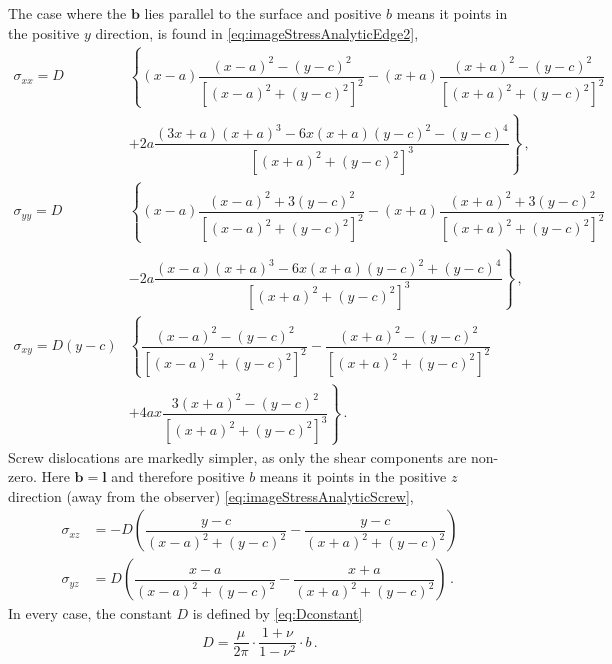 \documentclass[11pt]{iopart}
\begin{document}
The case where the $\bm{b}$ lies parallel to the surface and positive $b$ means it points in the positive $y$ direction, is found in \cref{eq:imageStressAnalyticEdge2},
\begin{subequations}
    \begin{align}\label{eq:imageStressAnalyticEdge2}
        \sigma_{xx} = D         & \left\{ (x - a) \dfrac{(x - a)^2 - (y - c)^2}{[(x - a)^2 + (y - c)^2]^2} -(x + a) \dfrac{(x + a)^2 - (y - c)^2}{[(x + a)^2 + (y - c)^2]^2} \right.     \\\nonumber
                                & \left. + 2 a \dfrac{(3 x + a) (x + a)^3 - 6 x (x + a) (y - c)^2 - (y - c)^4}{[(x + a)^2 + (y - c)^2]^3}\right\}\,,                                     \\
        \sigma_{yy} = D         & \left\{ (x - a) \dfrac{(x - a)^2 + 3 (y - c)^2}{[(x - a)^2 + (y - c)^2]^2} - (x + a) \dfrac{(x + a)^2 + 3 (y - c)^2}{[(x + a)^2 + (y - c)^2]^2}\right. \\\nonumber
                                & \left. - 2 a \dfrac{(x - a) (x + a)^3 - 6 x (x + a) (y - c)^2 + (y - c)^4}{[(x + a)^2 + (y - c)^2]^3}\right\}\,,                                       \\
        \sigma_{xy} = D (y - c) & \left\{\dfrac{(x - a)^2 - (y - c)^2}{[(x - a)^2 + (y - c)^2]^2} - \dfrac{(x + a)^2 - (y - c)^2}{[(x + a)^2 + (y - c)^2]^2} \right.                     \\\nonumber
                                & \left. + 4 a x \dfrac{3 (x + a)^2 - (y - c)^2}{[(x + a)^2 + (y - c)^2]^3}\right\}\,.
    \end{align}
\end{subequations}
Screw dislocations are markedly simpler, as only the shear components are non-zero. Here $\bm{b} = \bm{l}$ and therefore positive $b$ means it points in the positive $z$ direction (away from the observer) \cref{eq:imageStressAnalyticScrew},
\begin{subequations}
    \begin{align}\label{eq:imageStressAnalyticScrew}
        \sigma_{xz} & = -D \left(\dfrac{y - c}{(x - a)^2 + (y - c)^2} - \dfrac{y - c}{(x + a)^2 + (y - c)^2}\right)   \\
        \sigma_{yz} & = D \left(\dfrac{x - a}{(x - a)^2 + (y - c)^2} - \dfrac{x + a}{(x + a)^2 + (y - c)^2}\right)\,.
    \end{align}
\end{subequations}
In every case, the constant $D$ is defined by \cref{eq:Dconstant}
\begin{align}\label{eq:Dconstant}
    D = \dfrac{\mu}{2\pi} \cdot \dfrac{1+\nu}{1-\nu^2} \cdot b\,.
\end{align}
\end{document}
